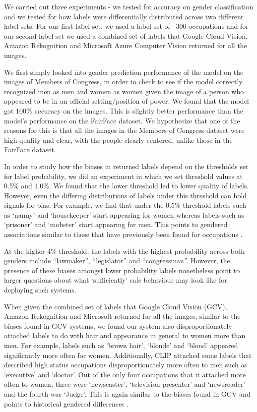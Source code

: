 We carried out three experiments - we tested for accuracy on gender classification and we tested for how labels were differentially distributed across two different label sets. For our first label set, we used a label set of ~300 occupations and for our second label set we used a combined set of labels that Google Cloud Vision, Amazon Rekognition and Microsoft Azure Computer Vision returned for all the images.

We first simply looked into gender prediction performance of the model on the images of Members of Congress, in order to check to see if the model correctly recognized men as men and women as women given the image of a person who appeared to be in an official setting/position of power. We found that the model got 100\% accuracy on the images. This is slightly better performance than the model’s performance on the FairFace dataset. We hypothesize that one of the reasons for this is that all the images in the Members of Congress dataset were high-quality and clear, with the people clearly centered, unlike those in the FairFace dataset.

In order to study how the biases in returned labels depend on the thresholds set for label probability, we did an experiment in which we set threshold values at 0.5\% and 4.0\%. We found that the lower threshold led to lower quality of labels. However, even the differing distributions of labels under this threshold can hold signals for bias. For example, we find that under the 0.5\% threshold labels such as ‘nanny’ and ‘housekeeper’ start appearing for women whereas labels such as ‘prisoner’ and ‘mobster’ start appearing for men. This points to gendered associations similar to those that have previously been found for occupations \citep{schwemmer2020diagnosing}  \citep{nosek2002harvesting}  \citep{bolukbasi2016man}.

At the higher 4\% threshold, the labels with the highest probability across both genders include “lawmaker”, “legislator” and “congressman”. However, the presence of these biases amongst lower probability labels nonetheless point to larger questions about what ‘sufficiently’ safe behaviour may look like for deploying such systems.

When given the combined set of labels that Google Cloud Vision (GCV), Amazon Rekognition and Microsoft returned for all the images, similar to the biases \citet{schwemmer2020diagnosing} found in GCV systems, we found our system also disproportionately attached labels to do with hair and appearance in general to women more than men. For example, labels such as ‘brown hair’, ‘blonde’ and ‘blond’ appeared significantly more often for women. Additionally, CLIP attached some labels that described high status occupations disproportionately more often to men such as  ‘executive’ and ‘doctor’. Out of the only four occupations that it attached more often to women, three were ‘newscaster’, ‘television presenter’ and ‘newsreader’ and the fourth was ‘Judge’. This is again similar to the biases found in GCV and points to historical gendered differences \citep{schwemmer2020diagnosing}.

